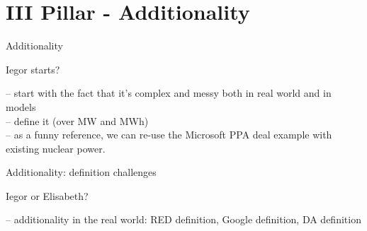 \section{III Pillar - Additionality}
\begin{frame}{Additionality}

  Iegor starts? 

  -- start with the fact that it's complex and messy both in real world and in models\\
  -- define it (over MW and MWh)\\
  -- as a funny reference, we can re-use the Microsoft PPA deal example with existing nuclear power.

\end{frame}


\begin{frame}{Additionality: definition challenges}

  Iegor or Elisabeth?

  -- additionality in the real world: RED definition, Google definition, DA definition\\

\end{frame}


